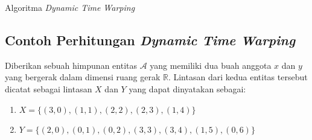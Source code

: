 \clearpage

\begin{algorithm}[t]
    \caption{Algoritma \textit{Dynamic Time Warping}}
    \DontPrintSemicolon
    
    \label{bab2:dtw-pseudocode}
 
  
    
\end{algorithm}

\subsection{Contoh Perhitungan \textit{Dynamic Time Warping}}
\label{subsec:contoh-dtw}

Diberikan sebuah himpunan entitas $\mathcal{A}$ yang memiliki dua buah anggota $x$ dan $y$ yang bergerak dalam dimensi ruang gerak $\mathbb{R}$. Lintasan dari kedua entitas tersebut dicatat sebagai lintasan $X$ dan $Y$ yang dapat dinyatakan sebagai: 

\begin{enumerate}
    \item $X = \{ (3, 0), (1, 1), (2, 2), (2, 3), (1, 4) \}$
    \item $Y = \{ (2, 0), (0, 1), (0, 2), (3, 3), (3, 4), (1, 5), (0, 6) \}$
\end{enumerate}

